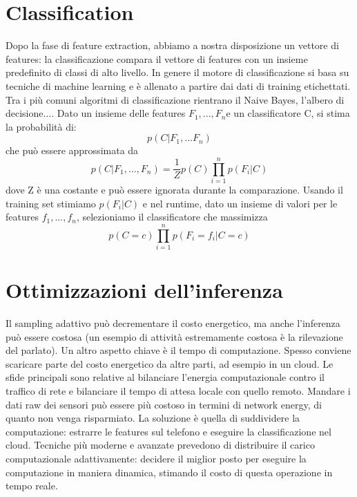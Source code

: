 \section{Classification}
Dopo la fase di feature extraction, abbiamo a nostra disposizione un vettore di
features: la classificazione compara il vettore di features con un insieme
predefinito di classi di alto livello. In genere il motore di classificazione si
basa su tecniche di machine learning e è allenato a partire dai dati di training
etichettati. Tra i più comuni algoritmi di classificazione rientrano il Naive
Bayes, l'albero di decisione....
\bigbreak
Dato un insieme delle features $F_1, ..., F_n$e un classificatore C, si stima la
probabilità di:
\begin{equation}
p(C|F_1, ...F_n)
\end{equation}
che può essere approssimata da
\begin{equation}
p(C|F_1,...,F_n)=\frac{1}{Z}p(C)\prod_{i=1}^{n}p(F_i|C)
\end{equation}
dove Z è una costante e può essere ignorata durante la comparazione. Usando il
training set stimiamo $p(F_i|C)$ e nel runtime, dato un insieme di valori per le
features $f_1, ..., f_n$, selezioniamo il classificatore che massimizza
\begin{equation}
p(C=c)\prod_{i=1}^{n}p(F_i=f_i|C=c)
\end{equation}

\section{Ottimizzazioni dell'inferenza}
Il sampling adattivo può decrementare il costo energetico, ma anche l'inferenza
può essere costosa (un esempio di attività estremamente costosa è la
rilevazione del parlato). Un altro aspetto chiave è il tempo di computazione.
Spesso conviene scaricare parte del costo energetico da altre parti, ad esempio
in un cloud.
Le sfide principali sono relative al bilanciare l'energia computazionale contro
il traffico di rete e bilanciare il tempo di attesa locale con quello remoto.
Mandare i dati raw dei sensori può essere più costoso in termini di network
energy, di quanto non venga risparmiato. La soluzione è quella di suddividere la
computazione: estrarre le features sul telefono e eseguire la classificazione
nel cloud. Tecniche più moderne e avanzate prevedono di distribuire il carico
computazionale adattivamente: decidere il miglior posto per eseguire la
computazione in maniera dinamica, stimando il costo di questa operazione in tempo
reale.
